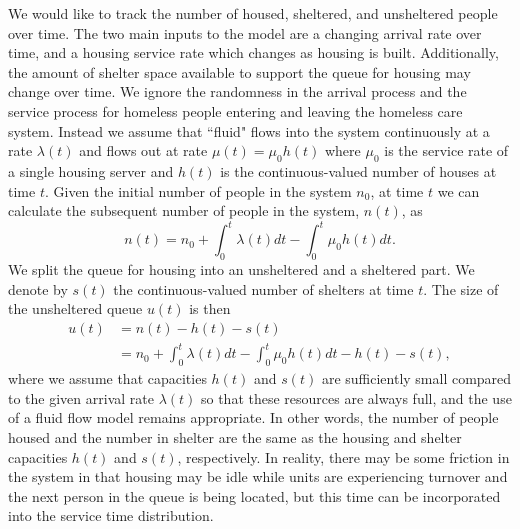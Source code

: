 \documentclass[12pt,a4paper]{article}
\begin{document}
We would like to track the number of housed, sheltered, and unsheltered people over time. The two main inputs to the model are a changing arrival rate over time, and a housing service rate which changes as housing is built.  Additionally, the amount of shelter space available to support the queue for housing may change over time. We ignore the randomness in the arrival process and the service process for homeless people entering and leaving the homeless care system. Instead we assume that ``fluid" flows into the system continuously at a rate $\lambda(t)$ and flows out at  rate $\mu(t) = \mu_{0}h(t)$ where $\mu_{0}$ is the service rate of a single housing server and $h(t)$ is the continuous-valued number of houses at time $t$. Given the initial number of people in the system $n_0$, at time $t$ we can calculate the subsequent number of people in the system, $n(t)$, as
%
\begin{equation*} \label{x_t}
n(t) = n_0 + \int_{0}^{t} \lambda(t) dt - \int_{0}^{t} \mu_0 h(t) dt.
\end{equation*}
%
We split the queue for housing into an unsheltered and a sheltered part. We denote by $s(t)$ the continuous-valued number of shelters at time $t$. The size of the unsheltered queue $u(t)$ is then 
%
\begin{align} 
u(t) & = n(t) - h(t) - s(t) \\
& = n_0 + \int_{0}^{t} \lambda(t) dt - \int_{0}^{t} \mu_0 h(t) dt - h(t) - s(t),
\label{u_t}
\end{align}
%
where we assume that capacities $h(t)$ and $s(t)$ are sufficiently small compared to the given arrival rate $\lambda(t)$ so that these resources are always full, and the use of a fluid flow model remains appropriate. In other words, the number of people housed and the number in shelter are the same as the housing and shelter capacities $h(t)$ and $s(t)$, respectively. In reality, there may be some friction in the system in that housing may be idle while units are experiencing turnover and the next person in the queue is being located, but this time can be incorporated into the service time distribution.
\end{document}
